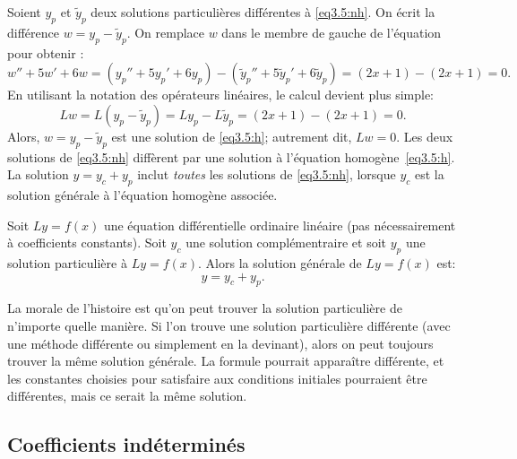Soient $y_p$ et $\tilde{y}_p$ deux solutions particulières différentes à \eqref{eq3.5:nh}.
On écrit la différence
$w = y_p - \tilde{y}_p$.  On remplace $w$
dans le membre de gauche de l'équation pour obtenir : 
\begin{equation*}
w'' + 5w'+ 6w =
(y_p'' + 5y_p'+ 6y_p) -
(\tilde{y}_p'' + 5\tilde{y}_p'+ 6\tilde{y}_p) =
(2x+1) - (2x+1) = 0 .
\end{equation*}
En utilisant la notation des opérateurs linéaires, le calcul devient plus simple:  
\begin{equation*}
Lw = L(y_p - \tilde{y}_p) =
Ly_p - L\tilde{y}_p =
(2x+1)-(2x+1) = 0 .
\end{equation*}
Alors, $w = y_p - \tilde{y}_p$ est une solution de \eqref{eq3.5:h}; autrement dit,
$Lw = 0$.  Les deux solutions de \eqref{eq3.5:nh} diffèrent par une solution à l'équation homogène~\eqref{eq3.5:h}.  La solution  $y = y_c + y_p$ inclut \emph{toutes} les
solutions de \eqref{eq3.5:nh},
lorsque $y_c$ est la solution générale à l'équation homogène associée. 

\begin{theorem}
Soit $Ly=f(x)$ une équation différentielle ordinaire linéaire (pas nécessairement à coefficients constants).  Soit  $y_c$ une solution complémentraire et soit $y_p$ une solution particulière à $Ly=f(x)$.  Alors la solution générale de $Ly=f(x)$ est: 
\begin{equation*}
y = y_c + y_p.
\end{equation*}
\end{theorem}

La morale de l'histoire est qu'on peut trouver la solution particulière de n'importe quelle manière. Si l'on trouve une solution particulière différente (avec une méthode différente ou simplement en la devinant), alors on peut toujours trouver la même solution générale. La formule pourrait apparaître différente, et les constantes choisies pour satisfaire aux conditions initiales pourraient être différentes, mais ce serait la même solution.  

\subsection{Coefficients indéterminés}

